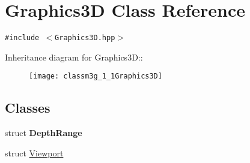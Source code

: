 \hypertarget{classm3g_1_1Graphics3D}{
\section{Graphics3D Class Reference}
\label{classm3g_1_1Graphics3D}
}
{\tt \#include $<$Graphics3D.hpp$>$}

Inheritance diagram for Graphics3D::\begin{figure}[H]
\begin{center}
\leavevmode
\texttt{[image: classm3g\_1\_1Graphics3D]}
\end{center}
\end{figure}
\subsection*{Classes}
\begin{CompactItemize}
\item 
struct \textbf{DepthRange}
\item 
struct \hyperlink{structm3g_1_1Graphics3D_1_1Viewport}{Viewport}
\end{CompactItemize}
